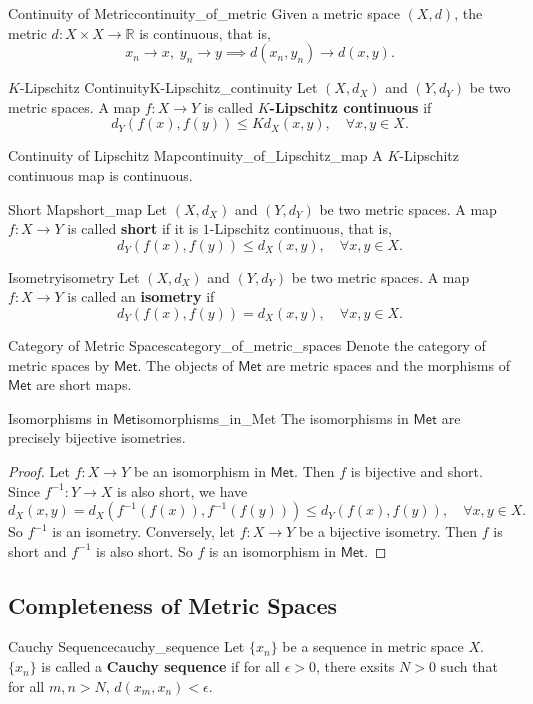 \documentclass{report}
\begin{document}
\begin{proposition}{Continuity of Metric}{continuity_of_metric}
	Given a metric space $(X,d)$, the metric $d:X\times X\to \mathbb{R}$ is continuous, that is,
	\[
		x_n\to x,\; y_n\to y\implies d(x_n,y_n)\to d(x,y).
	\]
\end{proposition}
\begin{definition}{$K$-Lipschitz Continuity}{K-Lipschitz_continuity}
	Let $(X,d_X)$ and $(Y,d_Y)$ be two metric spaces. A map $f:X\to Y$ is called \textbf{$K$-Lipschitz continuous} if
	\[
		d_Y(f(x),f(y))\le Kd_X(x,y),\quad\forall x,y\in X.
	\]
\end{definition}
\begin{proposition}{Continuity of Lipschitz Map}{continuity_of_Lipschitz_map}
	A $K$-Lipschitz continuous map is continuous.
\end{proposition}
\begin{definition}{Short Map}{short_map}
	Let $(X,d_X)$ and $(Y,d_Y)$ be two metric spaces. A map $f:X\to Y$ is called \textbf{short} if it is $1$-Lipschitz continuous, that is,
	\[
		d_Y(f(x),f(y))\le d_X(x,y),\quad\forall x,y\in X.
	\]
\end{definition}
\begin{definition}{Isometry}{isometry}
	Let $(X,d_X)$ and $(Y,d_Y)$ be two metric spaces. A map $f:X\to Y$ is called an \textbf{isometry} if
	\[
		d_Y(f(x),f(y))=d_X(x,y),\quad\forall x,y\in X.
	\]
\end{definition}
\begin{definition}{Category of Metric Spaces}{category_of_metric_spaces}
	Denote the category of metric spaces by $\mathsf{Met}$. The objects of $\mathsf{Met}$ are metric spaces and the morphisms of $\mathsf{Met}$ are short maps.
\end{definition}
\begin{proposition}{Isomorphisms in $\mathsf{Met}$}{isomorphisms_in_Met}
	The isomorphisms in $\mathsf{Met}$ are precisely bijective isometries.
\end{proposition}
\begin{proof}
	Let $f:X\to Y$ be an isomorphism in $\mathsf{Met}$. Then $f$ is bijective and short. Since $f^{-1}:Y\to X$ is also short, we have
	\[
		d_X(x,y)=d_X(f^{-1}(f(x)),f^{-1}(f(y)))\le d_Y(f(x),f(y)),\quad\forall x,y\in X.
	\]
	So $f^{-1}$ is an isometry. Conversely, let $f:X\to Y$ be a bijective isometry. Then $f$ is short and $f^{-1}$ is also short. So $f$ is an isomorphism in $\mathsf{Met}$.
\end{proof}
\subsection{Completeness of Metric Spaces}
\begin{definition}{Cauchy Sequence}{cauchy_sequence}
	Let $\{x_n\}$ be a sequence in metric space $X$. $\{x_n\}$ is called a \textbf{Cauchy sequence} if for all $\epsilon>0$, there exsits $N>0$ such that for all $m,n>N$, $d(x_m,x_n)<\epsilon$.
\end{definition}
\end{document}
